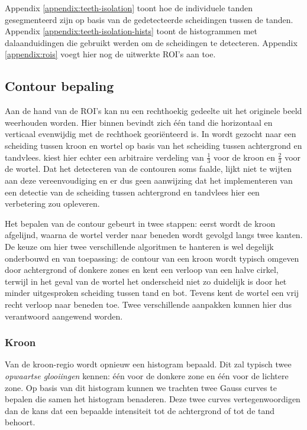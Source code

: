 \documentclass[10pt,a4paper]{article}
\begin{document}
Appendix \ref{appendix:teeth-isolation} toont hoe de individuele tanden gesegmenteerd zijn op basis van de gedetecteerde scheidingen tussen de tanden. Appendix \ref{appendix:teeth-isolation-hists} toont de histogrammen met dalaanduidingen die gebruikt werden om de scheidingen te detecteren. Appendix \ref{appendix:rois} voegt hier nog de uitwerkte ROI's aan toe.

\subsection*{Contour bepaling}

Aan de hand van de ROI's kan nu een rechthoekig gedeelte uit het originele beeld weerhouden worden. Hier binnen bevindt zich \'e\'en tand die horizontaal en verticaal evenwijdig met de rechthoek geori\"enteerd is. In \cite{chen2004tooth} wordt gezocht naar een scheiding tussen kroon en wortel op basis van het scheiding tussen achtergrond en tandvlees. \cite{jain2004matching} kiest hier echter een arbitraire verdeling van $\frac{1}{3}$ voor de kroon en $\frac{2}{3}$ voor de wortel. Dat het detecteren van de contouren soms faalde, lijkt niet te wijten aan deze vereenvoudiging en er dus geen aanwijzing dat het implementeren van een detectie van de scheiding tussen achtergrond en tandvlees hier een verbetering zou opleveren.

Het bepalen van de contour gebeurt in twee stappen: eerst wordt de kroon afgelijnd, waarna de wortel verder naar beneden wordt gevolgd langs twee kanten. De keuze om hier twee verschillende algoritmen te hanteren is wel degelijk onderbouwd en van toepassing: de contour van een kroon wordt typisch omgeven door achtergrond of donkere zones en kent een verloop van een halve cirkel, terwijl in het geval van de wortel het onderscheid niet zo duidelijk is door het minder uitgesproken scheiding tussen tand en bot. Tevens kent de wortel een vrij recht verloop naar beneden toe. Twee verschillende aanpakken kunnen hier dus verantwoord aangewend worden.

\subsubsection*{Kroon}

Van de kroon-regio wordt opnieuw een histogram bepaald. Dit zal typisch twee \emph{opwaartse glooiingen} kennen: \'e\'en voor de donkere zone en \'e\'en voor de lichtere zone. Op basis van dit histogram kunnen we trachten twee Gauss curves te bepalen die samen het histogram benaderen. Deze twee curves vertegenwoordigen dan de kans dat een bepaalde intensiteit tot de achtergrond of tot de tand behoort.
\end{document}
